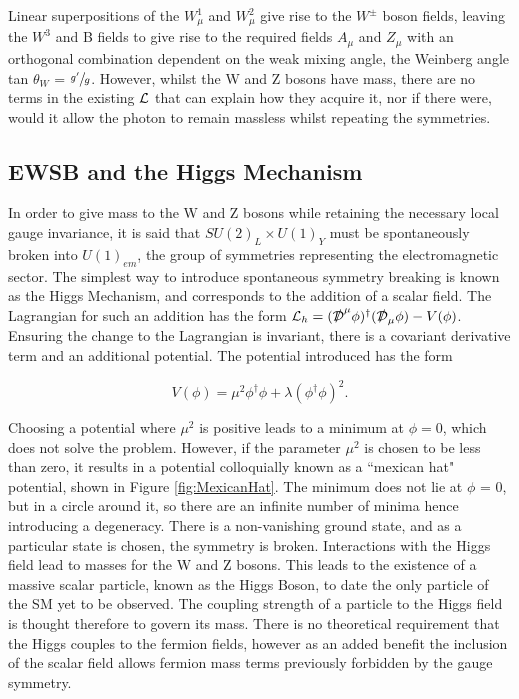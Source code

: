 Linear superpositions of the $W^{1}_{\mu}$ and $W^{2}_{\mu}$ give rise to the $W^{\pm}$ boson fields, leaving the $W^{3}$ and B fields to give rise to the required fields $A_{\mu}$ and $Z_{\mu}$ with an orthogonal combination dependent on the weak mixing angle, the Weinberg angle tan $\theta_{W}$ = $\sfrac{g'}{g}$. However, whilst the W and Z bosons have mass, there are no terms in the existing ${\mathcal{L}}$ that can explain how they acquire it, nor if there were, would it allow the photon to remain massless whilst repeating the symmetries. 

\subsection{EWSB and the Higgs Mechanism}

In order to give mass to the W and Z bosons while retaining the necessary local gauge invariance, it is said that $SU(2)_{L} \times U(1)_{Y}$ must be spontaneously broken into $U(1)_{em}$, the group of symmetries representing the electromagnetic sector. The simplest way to introduce spontaneous symmetry breaking is known as the Higgs Mechanism, and corresponds to the addition of a scalar field. The Lagrangian for such an addition has the form ${\mathcal{L}}_{h} = (\slashed{\mathcal{D}}^{\mu}\phi)^{\dagger}(\slashed{\mathcal{D}}_{\mu}\phi) - V(\phi)$. Ensuring the change to the Lagrangian is invariant, there is a covariant derivative term and an additional potential. The potential introduced has the form

\begin{equation}
V(\phi) = \mu^{2}\phi^{\dagger}\phi + \lambda (\phi^{\dagger}\phi)^{2}.
\end{equation}

Choosing a potential where $\mu^{2}$ is positive leads to a minimum at $\phi = 0$, which does not solve the problem. However, if the parameter $\mu^{2}$ is chosen to be less than zero, it results in a potential colloquially known as a ``mexican hat" potential, shown in Figure \ref{fig:MexicanHat}. The minimum does not lie at $\phi$ = 0, but in a circle around it, so there are an infinite number of minima hence introducing a degeneracy. There is a non-vanishing ground state, and as a particular state is chosen, the symmetry is broken. Interactions with the Higgs field lead to masses for the W and Z bosons. This leads to the existence of a massive scalar particle, known as the Higgs Boson, to date the only particle of the SM yet to be observed. The coupling strength of a particle to the Higgs field is thought therefore to govern its mass. There is no theoretical requirement that the Higgs couples to the fermion fields, however as an added benefit the inclusion of the scalar field allows fermion mass terms previously forbidden by the gauge symmetry.

